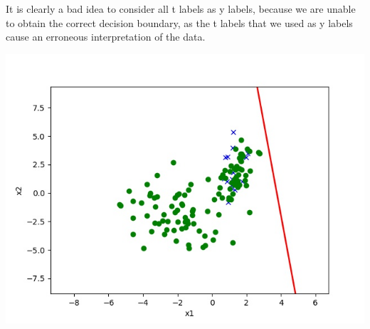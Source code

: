 \begin{answer}
It is clearly a bad idea to consider all t labels as y labels, because we are unable to obtain the correct decision boundary, as the t labels that we used as y labels cause an erroneous interpretation of the data.

\includegraphics{posonly_a}

\end{answer}
